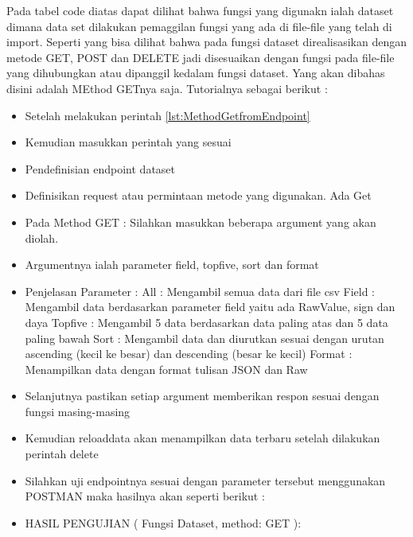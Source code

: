 \begin{enumerate}
  Pada tabel code diatas dapat dilihat bahwa fungsi yang digunakn ialah dataset dimana data set dilakukan pemaggilan fungsi yang ada di file-file yang telah di import. Seperti yang bisa dilihat bahwa pada fungsi dataset direalisasikan dengan metode GET, POST dan DELETE jadi disesuaikan dengan fungsi pada file-file yang dihubungkan atau dipanggil kedalam fungsi dataset. Yang akan dibahas disini adalah MEthod GETnya saja. Tutorialnya sebagai berikut :
  \begin{itemize}
    \item Setelah melakukan perintah \ref{lst:MethodGetfromEndpoint}
    \item Kemudian masukkan perintah yang sesuai
    \item Pendefinisian endpoint dataset
    \item Definisikan request atau permintaan metode yang digunakan. Ada Get 
    \item Pada Method GET : Silahkan masukkan beberapa argument yang akan diolah.
    \item Argumentnya ialah parameter field, topfive, sort dan format
    \item Penjelasan Parameter :
        \subitem All : Mengambil semua data dari file csv
        \subitem Field : Mengambil data berdasarkan parameter field yaitu ada RawValue, sign dan daya
        \subitem Topfive : Mengambil 5 data berdasarkan data paling atas dan 5 data paling bawah
        \subitem Sort : Mengambil data dan diurutkan sesuai dengan urutan ascending (kecil ke besar) dan descending (besar ke kecil)
        \subitem Format : Menampilkan data dengan format tulisan JSON dan Raw
    \item Selanjutnya pastikan setiap argument memberikan respon sesuai dengan fungsi masing-masing 
    \item Kemudian reloaddata akan menampilkan data terbaru setelah dilakukan perintah delete
    \item Silahkan uji endpointnya sesuai dengan parameter tersebut menggunakan POSTMAN maka hasilnya akan seperti berikut :
        
  \end{itemize}
\end{enumerate}

\begin{itemize}
\item HASIL PENGUJIAN ( Fungsi Dataset, method: GET ):
\end{itemize}

